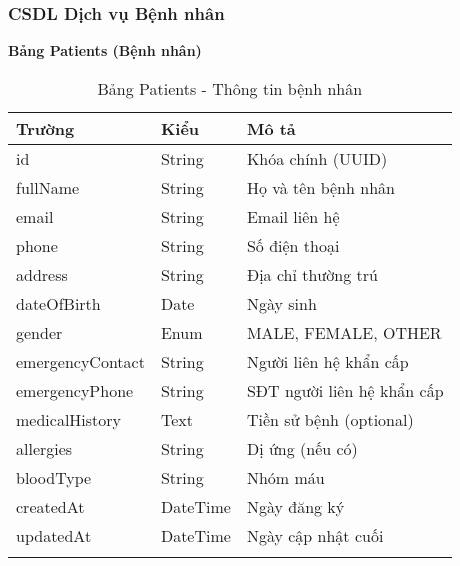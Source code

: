 \documentclass[12pt,a4paper]{report}
\begin{document}
    \subsubsection{CSDL Dịch vụ Bệnh nhân}
    \textbf{Bảng Patients (Bệnh nhân)}
    \begin{longtable}{|p{3cm}|p{2cm}|p{8cm}|}
    \hline
    \textbf{Trường} & \textbf{Kiểu} & \textbf{Mô tả} \\
    \hline
    id & String & Khóa chính (UUID) \\
    \hline
    fullName & String & Họ và tên bệnh nhân \\
    \hline
    email & String & Email liên hệ \\
    \hline
    phone & String & Số điện thoại \\
    \hline
    address & String & Địa chỉ thường trú \\
    \hline
    dateOfBirth & Date & Ngày sinh \\
    \hline
    gender & Enum & MALE, FEMALE, OTHER \\
    \hline
    emergencyContact & String & Người liên hệ khẩn cấp \\
    \hline
    emergencyPhone & String & SĐT người liên hệ khẩn cấp \\
    \hline
    medicalHistory & Text & Tiền sử bệnh (optional) \\
    \hline
    allergies & String & Dị ứng (nếu có) \\
    \hline
    bloodType & String & Nhóm máu \\
    \hline
    createdAt & DateTime & Ngày đăng ký \\
    \hline
    updatedAt & DateTime & Ngày cập nhật cuối \\
    \hline
    \caption{Bảng Patients - Thông tin bệnh nhân}
    \end{longtable}
\end{document}
